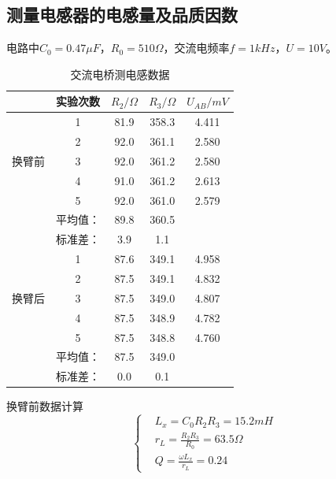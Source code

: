 \documentclass[10pt,a4paper,twocolumn,twoside,UTF8]{ctexart}
\begin{document}
\subsection{测量电感器的电感量及品质因数}
电路中$C_0=0.47\mu F$，$R_0=510\Omega$，交流电频率$f=1kHz$，$U=10V$。
\begin{table}[!h]
	\centering
	  \begin{tabular}{c|cccc}
	  \toprule
	  \multicolumn{1}{c}{} & 实验次数  & $R_2/\Omega$   & $R_3/\Omega$   & $U_{AB}/mV$  \\
	  \midrule
	  \multicolumn{1}{c}{\multirow{5}[2]{*}{换臂前}} & 1     & 81.9 & 358.3  & 4.411  \\
	  \multicolumn{1}{c}{} & 2     & 92.0 & 361.1  & 2.580 \\
	  \multicolumn{1}{c}{} & 3     & 92.0 & 361.2  & 2.580 \\
	  \multicolumn{1}{c}{} & 4     & 91.0 & 361.2  & 2.613  \\
	  \multicolumn{1}{c}{} & 5     & 92.0 & 361.0  & 2.579  \\
	  \midrule
	  \multicolumn{1}{c}{}  & 平均值：  & 89.8 & 360.5 &  \\
	  \multicolumn{1}{c}{}  & 标准差：  & 3.9 & 1.1 &  \\
	  \midrule
	  \multicolumn{1}{c}{\multirow{5}[2]{*}{换臂后}} & 1     & 87.6 & 349.1  & 4.958\\
	  \multicolumn{1}{c}{} & 2     & 87.5 & 349.1  & 4.832 \\
	  \multicolumn{1}{c}{} & 3     & 87.5 & 349.0  & 4.807 \\
	  \multicolumn{1}{c}{} & 4     & 87.5 & 348.9  & 4.782\\
	  \multicolumn{1}{c}{} & 5     & 87.5 & 348.8  & 4.760 \\
	  \midrule
	  \multicolumn{1}{c}{}& 平均值：  & 87.5 & 349.0 &  \\
	  \multicolumn{1}{c}{}& 标准差：  & 0.0 & 0.1 &  \\
	  \bottomrule
	  \end{tabular}%
   \caption{交流电桥测电感数据}
   \label{tab:5}
  \end{table}%

  换臂前数据计算
  \[\left\{%
  \begin{aligned}
  &L_x=C_0 R_2 R_3=15.2 mH\\
  &r_L=\frac{R_2 R_3}{R_0}=63.5\Omega\\
  &Q=\frac{\omega L_x}{r_L}=0.24
  \end{aligned}
 \right.
\]
\end{document}

